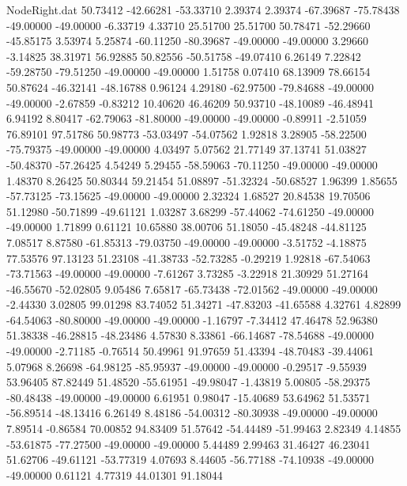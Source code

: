 \begin{filecontents}{NodeRight.dat}
  50.73412  -42.66281  -53.33710     2.39374    2.39374  -67.39687  -75.78438  -49.00000  -49.00000   -6.33719    4.33710   25.51700   25.51700
  50.78471  -52.29660  -45.85175     3.53974    5.25874  -60.11250  -80.39687  -49.00000  -49.00000    3.29660   -3.14825   38.31971   56.92885
  50.82556  -50.51758  -49.07410     6.26149    7.22842  -59.28750  -79.51250  -49.00000  -49.00000    1.51758    0.07410   68.13909   78.66154
  50.87624  -46.32141  -48.16788     0.96124    4.29180  -62.97500  -79.84688  -49.00000  -49.00000   -2.67859   -0.83212   10.40620   46.46209
  50.93710  -48.10089  -46.48941     6.94192    8.80417  -62.79063  -81.80000  -49.00000  -49.00000   -0.89911   -2.51059   76.89101   97.51786
  50.98773  -53.03497  -54.07562     1.92818    3.28905  -58.22500  -75.79375  -49.00000  -49.00000    4.03497    5.07562   21.77149   37.13741
  51.03827  -50.48370  -57.26425     4.54249    5.29455  -58.59063  -70.11250  -49.00000  -49.00000    1.48370    8.26425   50.80344   59.21454
  51.08897  -51.32324  -50.68527     1.96399    1.85655  -57.73125  -73.15625  -49.00000  -49.00000    2.32324    1.68527   20.84538   19.70506
  51.12980  -50.71899  -49.61121     1.03287    3.68299  -57.44062  -74.61250  -49.00000  -49.00000    1.71899    0.61121   10.65880   38.00706
  51.18050  -45.48248  -44.81125     7.08517    8.87580  -61.85313  -79.03750  -49.00000  -49.00000   -3.51752   -4.18875   77.53576   97.13123
  51.23108  -41.38733  -52.73285    -0.29219    1.92818  -67.54063  -73.71563  -49.00000  -49.00000   -7.61267    3.73285   -3.22918   21.30929
  51.27164  -46.55670  -52.02805     9.05486    7.65817  -65.73438  -72.01562  -49.00000  -49.00000   -2.44330    3.02805   99.01298   83.74052
  51.34271  -47.83203  -41.65588     4.32761    4.82899  -64.54063  -80.80000  -49.00000  -49.00000   -1.16797   -7.34412   47.46478   52.96380
  51.38338  -46.28815  -48.23486     4.57830    8.33861  -66.14687  -78.54688  -49.00000  -49.00000   -2.71185   -0.76514   50.49961   91.97659
  51.43394  -48.70483  -39.44061     5.07968    8.26698  -64.98125  -85.95937  -49.00000  -49.00000   -0.29517   -9.55939   53.96405   87.82449
  51.48520  -55.61951  -49.98047    -1.43819    5.00805  -58.29375  -80.48438  -49.00000  -49.00000    6.61951    0.98047  -15.40689   53.64962
  51.53571  -56.89514  -48.13416     6.26149    8.48186  -54.00312  -80.30938  -49.00000  -49.00000    7.89514   -0.86584   70.00852   94.83409
  51.57642  -54.44489  -51.99463     2.82349    4.14855  -53.61875  -77.27500  -49.00000  -49.00000    5.44489    2.99463   31.46427   46.23041
  51.62706  -49.61121  -53.77319     4.07693    8.44605  -56.77188  -74.10938  -49.00000  -49.00000    0.61121    4.77319   44.01301   91.18044

\end{filecontents}
